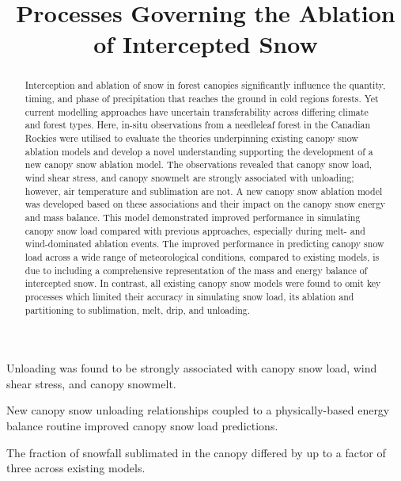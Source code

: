 \documentclass[
]{agujournal2019}
\begin{document}
\title{Processes Governing the Ablation of Intercepted Snow}


\begin{keypoints}
\item Unloading was found to be strongly associated with canopy snow
load, wind shear stress, and canopy snowmelt. \item New canopy snow
unloading relationships coupled to a physically-based energy balance
routine improved canopy snow load predictions. \item The fraction of
snowfall sublimated in the canopy differed by up to a factor of three
across existing models. 
\end{keypoints}

\begin{abstract}
Interception and ablation of snow in forest canopies significantly
influence the quantity, timing, and phase of precipitation that reaches
the ground in cold regions forests. Yet current modelling approaches
have uncertain transferability across differing climate and forest
types. Here, in-situ observations from a needleleaf forest in the
Canadian Rockies were utilised to evaluate the theories underpinning
existing canopy snow ablation models and develop a novel understanding
supporting the development of a new canopy snow ablation model. The
observations revealed that canopy snow load, wind shear stress, and
canopy snowmelt are strongly associated with unloading; however, air
temperature and sublimation are not. A new canopy snow ablation model
was developed based on these associations and their impact on the canopy
snow energy and mass balance. This model demonstrated improved
performance in simulating canopy snow load compared with previous
approaches, especially during melt- and wind-dominated ablation events.
The improved performance in predicting canopy snow load across a wide
range of meteorological conditions, compared to existing models, is due
to including a comprehensive representation of the mass and energy
balance of intercepted snow. In contrast, all existing canopy snow
models were found to omit key processes which limited their accuracy in
simulating snow load, its ablation and partitioning to sublimation,
melt, drip, and unloading.
\end{abstract}
\end{document}
